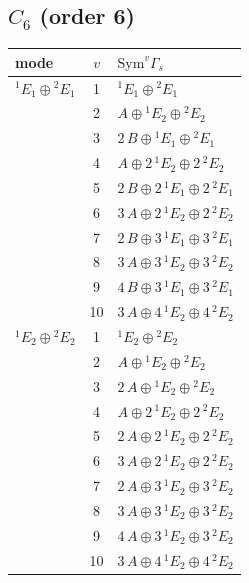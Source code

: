 \documentclass[11pt]{article}
\begin{document}
\subsection*{$C_{6}$ \quad (order 6)}
\begin{longtable}{l c p{}}
\hline mode & $v$ & $\mathrm{Sym}^v\Gamma_s$\\ \hline\endhead
${}^{1}E_{1}\oplus {}^{2}E_{1}$ & 1 & ${}^{1}E_{1}\oplus {}^{2}E_{1}$\\
 & 2 & $A\oplus {}^{1}E_{2}\oplus {}^{2}E_{2}$\\
 & 3 & $2\,B\oplus {}^{1}E_{1}\oplus {}^{2}E_{1}$\\
 & 4 & $A\oplus 2\,{}^{1}E_{2}\oplus 2\,{}^{2}E_{2}$\\
 & 5 & $2\,B\oplus 2\,{}^{1}E_{1}\oplus 2\,{}^{2}E_{1}$\\
 & 6 & $3\,A\oplus 2\,{}^{1}E_{2}\oplus 2\,{}^{2}E_{2}$\\
 & 7 & $2\,B\oplus 3\,{}^{1}E_{1}\oplus 3\,{}^{2}E_{1}$\\
 & 8 & $3\,A\oplus 3\,{}^{1}E_{2}\oplus 3\,{}^{2}E_{2}$\\
 & 9 & $4\,B\oplus 3\,{}^{1}E_{1}\oplus 3\,{}^{2}E_{1}$\\
 & 10 & $3\,A\oplus 4\,{}^{1}E_{2}\oplus 4\,{}^{2}E_{2}$\\
\hline
${}^{1}E_{2}\oplus {}^{2}E_{2}$ & 1 & ${}^{1}E_{2}\oplus {}^{2}E_{2}$\\
 & 2 & $A\oplus {}^{1}E_{2}\oplus {}^{2}E_{2}$\\
 & 3 & $2\,A\oplus {}^{1}E_{2}\oplus {}^{2}E_{2}$\\
 & 4 & $A\oplus 2\,{}^{1}E_{2}\oplus 2\,{}^{2}E_{2}$\\
 & 5 & $2\,A\oplus 2\,{}^{1}E_{2}\oplus 2\,{}^{2}E_{2}$\\
 & 6 & $3\,A\oplus 2\,{}^{1}E_{2}\oplus 2\,{}^{2}E_{2}$\\
 & 7 & $2\,A\oplus 3\,{}^{1}E_{2}\oplus 3\,{}^{2}E_{2}$\\
 & 8 & $3\,A\oplus 3\,{}^{1}E_{2}\oplus 3\,{}^{2}E_{2}$\\
 & 9 & $4\,A\oplus 3\,{}^{1}E_{2}\oplus 3\,{}^{2}E_{2}$\\
 & 10 & $3\,A\oplus 4\,{}^{1}E_{2}\oplus 4\,{}^{2}E_{2}$\\
\hline
\end{longtable}
\end{document}
